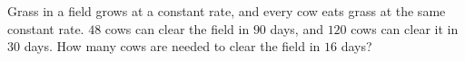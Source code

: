 Grass in a field grows at a constant rate, and every cow eats grass at the same constant rate. $48$ cows can clear the field in $90$ days, and $120$ cows can clear it in $30$ days. How many cows are needed to clear the field in $16$ days?
